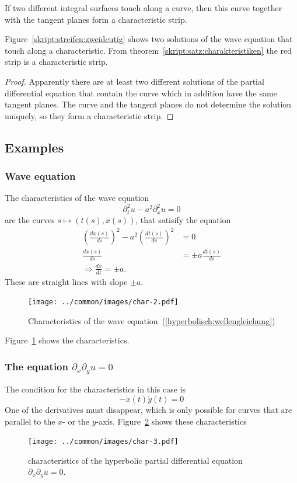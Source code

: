\begin{satz}
\label{skript:satz:charakteristiken}
If two different integral surfaces touch along a curve,
then this curve together with the tangent planes form a characteristic strip.
\end{satz}

Figure~\ref{skript:streifen:zweideutig} shows two solutions of the wave
equation that touch along a characteristic.
From theorem~\ref{skript:satz:charakteristiken} the red strip is a 
characteristic strip.

\begin{proof}
Apparently there are at least two different solutions of the
partial differential equation that contain the curve which in
addition have the same tangent planes.
The curve and the tangent planes do not determine the solution
uniquely, so they form a characteristic strip.
\end{proof}

\subsection{Examples}
\subsubsection{Wave equation}
The characteristics of the wave equation
\begin{equation}
\partial_t^2u-a^2\partial_x^2u=0
\label{hyperbolisch:wellengleichung}
\end{equation}
are the curves $s\mapsto(t(s),x(s))$, that satisify the equation
\begin{align*}
\left(
\frac{dx(s)}{ds}\right)^2-a^2\left(\frac{dt(s)}{ds}\right)^2&=0
\\
\frac{dx(s)}{ds}
&=
\pm a\frac{dt(s)}{ds}
\\
\Rightarrow
\frac{dx}{dt}=\pm a.
\end{align*}
These are straight lines with slope $\pm a$.
\begin{figure}
\begin{center}
\texttt{[image: ../common/images/char-2.pdf]}
\end{center}
\caption{Characteristics of the wave
equation~(\ref{hyperbolisch:wellengleichung})
\label{hyp:wellen}}
\end{figure}
Figure~\ref{hyp:wellen} shows the characteristics.

\subsubsection{The equation $\partial_x\partial_yu=0$}
The condition for the characteristics in this case is
\[
-\dot x(t)\dot y(t)=0
\]
One of the derivatives must disappear, which is only possible for
curves that are parallel to the $x$- or the $y$-axis.
Figure~\ref{hyp:dxdy} shows these characteristics
\begin{figure}
\begin{center}
\texttt{[image: ../common/images/char-3.pdf]}
\end{center}
\caption{characteristics of the hyperbolic partial differential equation
$\partial_x\partial_yu=0$.
\label{hyp:dxdy}}
\end{figure}

